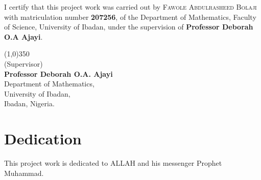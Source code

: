 \documentclass[
    a4paper,%
    12pt,%
    oneside, %
    openany, %
]{book}
\begin{document}
\renewcommand{\thepage}{\roman{page}}
I certify that this project work was carried out by \textsc{Fawole Abdulrasheed Bolaji} with matriculation number \textbf{207256}, of the Department of Mathematics, Faculty of Science, University of Ibadan, under the supervision of \textbf{Professor Deborah O.A Ajayi}.
\vspace*{3cm}
\begin{center}
    \line(1,0){350}\\
    (Supervisor)\\
    \vspace*{-0.25cm}
    \textbf{Professor Deborah O.A. Ajayi}
    \\
    \vspace*{-0.25cm}
    Department of Mathematics,
    \\
    \vspace*{-0.25cm}
    University of Ibadan,
    \\
    \vspace*{-0.25cm}
    Ibadan, Nigeria.

\end{center}
\newpage

\chapter*{Dedication}
This project work is dedicated to ALLAH and his messenger Prophet Muhammad.

\newpage



{}
\tableofcontents
\listoffigures
\newpage
{}







\end{document}

